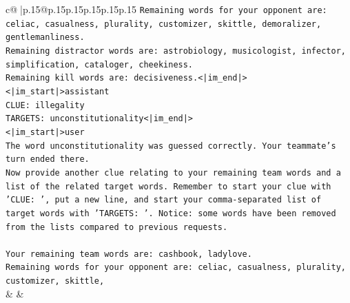 \documentclass{article}
\begin{document}
{\begin{supertabular}{c@{$\;$}|p{.15\linewidth}@{}p{.15\linewidth}p{.15\linewidth}p{.15\linewidth}p{.15\linewidth}p{.15\linewidth}}
{{{\texttt{Remaining words for your opponent are: celiac, casualness, plurality, customizer, skittle, demoralizer, gentlemanliness.} \\
\texttt{Remaining distractor words are: astrobiology, musicologist, infector, simplification, cataloger, cheekiness.} \\
\texttt{Remaining kill words are: decisiveness.<|im\_end|>} \\
\texttt{<|im\_start|>assistant} \\
\texttt{CLUE: illegality} \\
\texttt{TARGETS: unconstitutionality<|im\_end|>} \\
\texttt{<|im\_start|>user} \\
\texttt{The word unconstitutionality was guessed correctly. Your teammate's turn ended there.} \\
\texttt{Now provide another clue relating to your remaining team words and a list of the related target words. Remember to start your clue with 'CLUE: ', put a new line, and start your comma{-}separated list of target words with 'TARGETS: '. Notice: some words have been removed from the lists compared to previous requests.} \\
\\ 
\texttt{Your remaining team words are: cashbook, ladylove.} \\
\texttt{Remaining words for your opponent are: celiac, casualness, plurality, customizer, skittle,} \\
            }
        }
    }
    & & \\ \\


\end{supertabular}}
\end{document}
